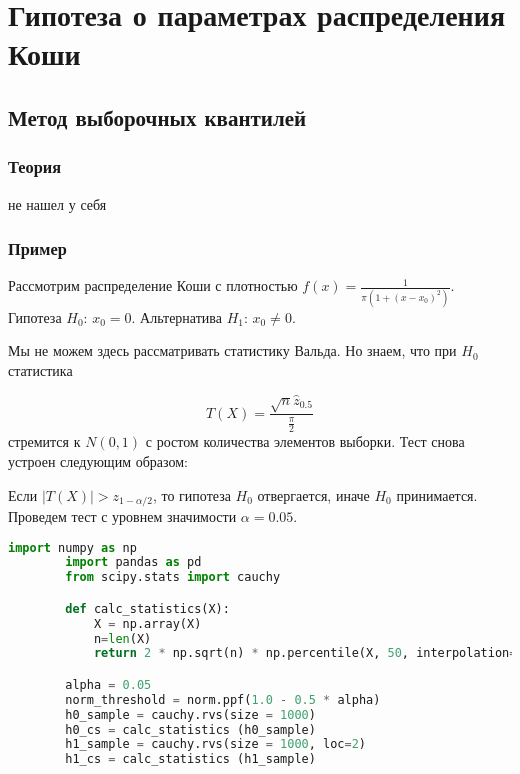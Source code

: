 \section{Гипотеза о параметрах распределения Коши}\label{cha:1sample/sec:cauchy}

\subsection{Метод выборочных квантилей}\label{cha:1sample/sec:cauchy/subsec:quant}

\subsubsection*{Теория}\label{cha:1sample/sec:cauchy/subsec:quant/subsubsec:theory}

не нашел у себя

\subsubsection*{Пример}\label{cha:1sample/sec:cauchy/subsec:quant/subsubsec:python}

\begin{problem}
	 Рассмотрим распределение Коши с плотностью $f(x) = \frac{1}{\pi (1 + (x - x_0)^2)}.$ Гипотеза $H_0$: $x_0 = 0$. Альтернатива $H_1$: $x_0 \neq 0$.
\end{problem}
\begin{solution}
Мы не можем здесь рассматривать статистику Вальда. Но знаем, что при $H_0$ статистика

$$ T(X) = \frac{\sqrt{n} \widehat{z}_{0.5}}{\frac{\pi}{2}} $$ стремится к $N(0, 1)$ с ростом количества элементов выборки. Тест снова устроен следующим образом:

Если $|T(X)| > z_{1-\alpha/2}$, то гипотеза $H_0$ отвергается, иначе $H_0$ принимается. Проведем тест с уровнем значимости $\alpha = 0.05$.


	\begin{lstlisting}[language=Python]
		import numpy as np
		import pandas as pd
		from scipy.stats import cauchy

		def calc_statistics(X):
		    X = np.array(X)
		    n=len(X)
		    return 2 * np.sqrt(n) * np.percentile(X, 50, interpolation='lower') / (np.pi)

		alpha = 0.05
		norm_threshold = norm.ppf(1.0 - 0.5 * alpha)
		h0_sample = cauchy.rvs(size = 1000)
		h0_cs = calc_statistics (h0_sample)
		h1_sample = cauchy.rvs(size = 1000, loc=2)
		h1_cs = calc_statistics (h1_sample) 
	\end{lstlisting}
\end{solution}

